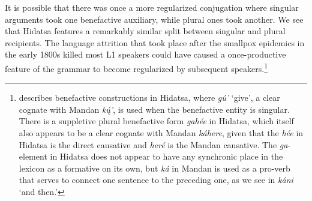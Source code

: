 It is possible that there was once a more regularized conjugation where singular arguments took one benefactive auxiliary, while plural ones took another. We see that Hidatsa features a remarkably similar split between singular and plural recipients. The language attrition that took place after the smallpox epidemics in the early 1800s killed most L1 speakers could have caused a once-productive feature of the grammar to become regularized by subsequent speakers.\footnote{\citet[541]{park2012} describes benefactive constructions in Hidatsa, where \textit{gú'} `give', a clear cognate with Mandan \textit{kų́'}, is used when the benefactive entity is singular. There is a suppletive plural benefactive form \textit{gahée} in Hidatsa, which itself also appears to be a clear cognate with Mandan \textit{káhere}, given that the \textit{hée} in Hidatsa is the direct causative and \textit{heré} is the Mandan causative. The \textit{ga}- element in Hidatsa does not appear to have any synchronic place in the lexicon as a formative on its own, but \textit{ká} in Mandan is used as a pro-verb that serves to connect one sentence to the preceding one, as we see in \textit{káni} `and then.'}

